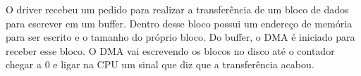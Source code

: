 \begin{question}

  O driver recebeu um pedido para realizar a transferência de um bloco de dados 
  para escrever em um buffer. Dentro desse bloco possui um endereço de memória para ser 
  escrito e o tamanho do próprio bloco. Do buffer, o DMA é iniciado para receber esse bloco. O DMA vai
  escrevendo os blocos no disco até o contador chegar a 0 e ligar na CPU um sinal que diz que a transferência acabou.
\end{question}
